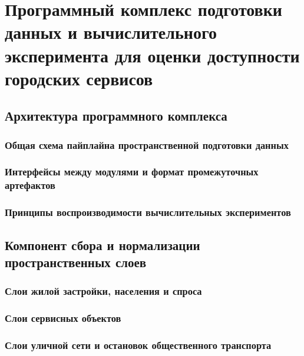 \chapter{Программный комплекс подготовки данных и вычислительного эксперимента для оценки доступности городских сервисов}
\label{ch:software-pipeline}

\section{Архитектура программного комплекса}
\label{sec:pipeline-architecture}

\subsection{Общая схема пайплайна пространственной подготовки данных}
\label{subsec:pipeline-overview}

\subsection{Интерфейсы между модулями и формат промежуточных артефактов}
\label{subsec:pipeline-artifacts}

\subsection{Принципы воспроизводимости вычислительных экспериментов}
\label{subsec:reproducibility}

\section{Компонент сбора и нормализации пространственных слоев}
\label{sec:data-collection-component}

\subsection{Слои жилой застройки, населения и спроса}
\label{subsec:population-demand-layers}

\subsection{Слои сервисных объектов}
\label{subsec:service-layers}

\subsection{Слои уличной сети и остановок общественного транспорта}
\label{subsec:street-pt-layers}

